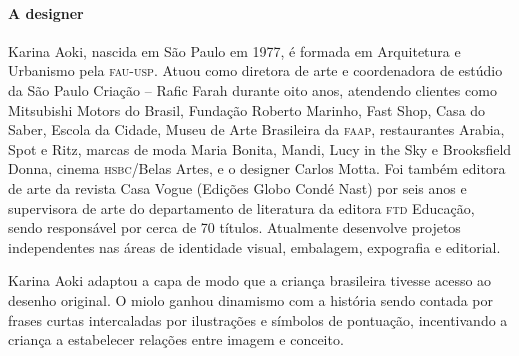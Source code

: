 \documentclass[11pt]{extarticle}
\begin{document}

\paragraph{A designer} Karina Aoki, nascida em São Paulo em 1977, é formada em Arquitetura e Urbanismo pela \textsc{fau-usp}. Atuou como diretora de arte e coordenadora de estúdio da São Paulo Criação -- Rafic Farah durante oito anos, atendendo clientes como Mitsubishi Motors do Brasil, Fundação Roberto Marinho, Fast Shop, Casa do Saber, Escola da Cidade, Museu de Arte Brasileira da \textsc{faap}, restaurantes Arabia, Spot e Ritz, marcas de moda Maria Bonita, Mandi, Lucy in the Sky e
Brooksfield Donna, cinema \textsc{hsbc}/Belas Artes, e o designer Carlos Motta. Foi também editora de arte da revista Casa Vogue (Edições Globo Condé Nast) por seis anos e supervisora de arte do departamento de literatura da editora \textsc{ftd} Educação, sendo responsável por cerca de 70 títulos. Atualmente desenvolve projetos independentes nas áreas de identidade visual, embalagem, expografia e editorial.

Karina Aoki adaptou a capa de modo que a criança brasileira tivesse acesso ao
desenho original. O miolo ganhou dinamismo com a história sendo contada por frases curtas
intercaladas por ilustrações e símbolos de pontuação, incentivando a criança a estabelecer
relações entre imagem e conceito.

\end{document}
